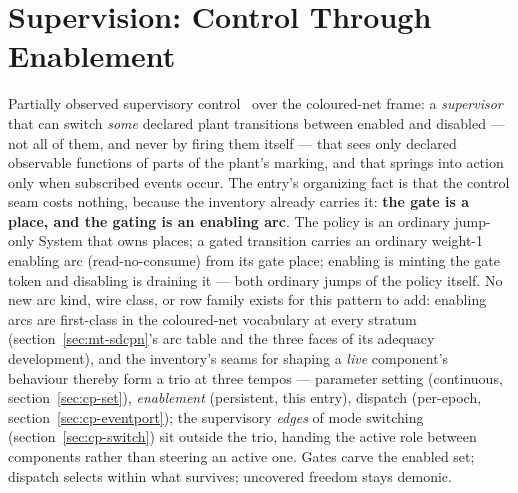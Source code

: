 

\section{Supervision: Control Through Enablement}
\label{sec:cp-supervise}

Partially observed supervisory
control~\cite{ramadge1987supervisory,lin88} over the coloured-net frame: a
\emph{supervisor} that can switch \emph{some}
declared plant transitions between enabled and disabled --- not all
of them, and never by firing them itself --- that sees only declared
observable functions of parts of the plant's marking, and that
springs into action only when subscribed events occur. The entry's
organizing fact is that the control seam costs nothing, because the
inventory already carries it: \textbf{the gate is a place, and the
gating is an enabling arc}. The policy is an ordinary jump-only
System that owns places; a gated transition carries an ordinary
weight-1 enabling arc (read-no-consume) from its gate place; enabling
is minting the gate token and disabling is draining it --- both
ordinary jumps of the policy itself. No new arc kind, wire class, or
row family exists for this pattern to add: enabling arcs are
first-class in the coloured-net vocabulary at every stratum
(section~\ref{sec:mt-sdcpn}'s arc table and the three faces of its
adequacy development), and the inventory's seams for shaping a
\emph{live} component's behaviour thereby form a trio at three tempos
--- parameter setting (continuous, section~\ref{sec:cp-set}),
\emph{enablement} (persistent, this entry), dispatch (per-epoch,
section~\ref{sec:cp-eventport}); the supervisory \emph{edges} of mode
switching (section~\ref{sec:cp-switch}) sit outside the trio, handing
the active role between components rather than steering an active
one. Gates carve the enabled set; dispatch selects within what
survives; uncovered freedom stays demonic.

